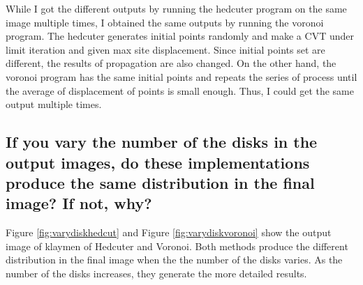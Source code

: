 \documentclass[11pt]{article}
\begin{document}
While I got the different outputs by running the hedcuter program on the same image multiple times, I obtained the same outputs by running the voronoi program. The hedcuter generates initial points randomly and make a CVT under limit iteration and given max site displacement. Since initial points set are different, the results of propagation are also changed. On the other hand, the voronoi program has the same initial points and repeats the series of process until the average of displacement of points is small enough. Thus, I could get the same output multiple times.

\subsection{If you vary the number of the disks in the output images, do these implementations produce the same distribution in the final image? If not, why?}%
Figure \ref{fig:varydiskhedcut} and Figure \ref{fig:varydiskvoronoi} show the output image of klaymen of Hedcuter and Voronoi. Both methods produce the different distribution in the final image when the the number of the disks varies. As the number of the disks increases, they generate the more detailed results.
\end{document}
